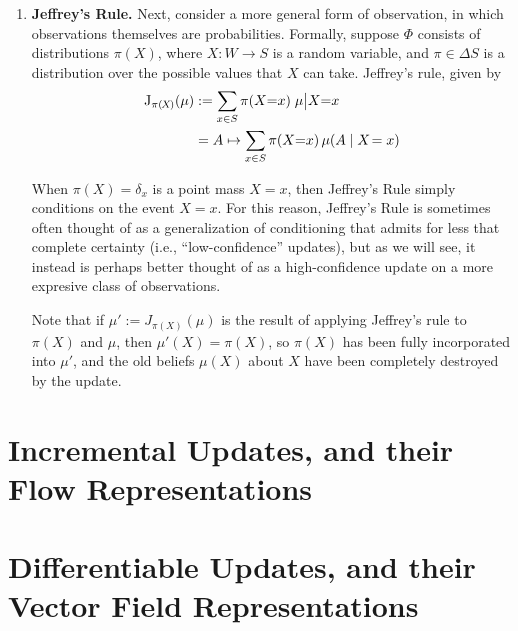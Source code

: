\documentclass{uai2023} %
\begin{document}
\begin{enumerate}
	\item \textbf{Jeffrey's Rule.}
	Next, consider a more general form of observation, in which observations themselves are probabilities.
	Formally, suppose $\Phi$ consists of distributions $\pi(X)$,
	where $X : W \to S$ is a random variable,
	and $\pi \in \Delta S$ is a distribution over the possible values that $X$ can take.
	Jeffrey's rule, given by
	\begin{align*}
		\mathrm{J}_{\pi(\mskip-2muX\mskip-2mu)}
		(\mu) &:= \sum_{x \in S} \pi(X{=}x) \;  \mu \big|
            X{=}x
			\\
			&= A \mapsto \sum_{x \in S} \pi(X{=}x)\, \mu( A \mid X \!= x)
	\end{align*}

	When $\pi(X) = \delta_x$ is a point mass $X=x$, then Jeffrey's Rule simply conditions on the event $X = x$.
	For this reason, Jeffrey's Rule is sometimes often thought of as a generalization of conditioning that admits for less that complete certainty (i.e., ``low-confidence'' updates), but as we will see, it instead is perhaps better thought of as a high-confidence update on a more expresive class of observations.

	Note that if $\mu' := J_{\pi(X)}(\mu)$ is the result of applying Jeffrey's rule to $\pi(X)$ and $\mu$,
	then $\mu'(X) = \pi(X)$, so $\pi(X)$ has been fully
        incorporated into $\mu'$, and the old beliefs $\mu(X)$ about
        $X$ have been completely destroyed by the update. 
\end{enumerate}
 

\section{Incremental Updates, and their
    Flow Representations} \label{sec:flow-repr}
% 

\section{Differentiable Updates, and their
    Vector Field Representations} \label{sec:field-repr}
% 
\end{document}
